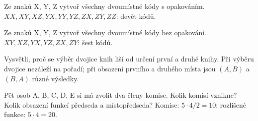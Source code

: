 \documentclass[11pt,a4paper]{article}
\begin{document}

\begin{zadaniReseniBox}[title={Samostatná práce 1}]
Ze znaků X, Y, Z vytvoř všechny dvoumístné kódy s opakováním.
\tcblower
$XX,XY,XZ,YX,YY,YZ,ZX,ZY,ZZ$: devět kódů.
\end{zadaniReseniBox}



\begin{zadaniReseniBox}[title={Samostatná práce 2}]
Ze znaků X, Y, Z vytvoř všechny dvoumístné kódy bez opakování.
\tcblower
$XY,XZ,YX,YZ,ZX,ZY$: šest kódů.
\end{zadaniReseniBox}



\begin{zadaniReseniBox}[title={Samostatná práce 3}]
Vysvětli, proč se výběr dvojice knih liší od určení první a druhé knihy.
\tcblower
Při výběru dvojice nezáleží na pořadí; při obsazení prvního a druhého místa jsou $(A,B)$ a $(B,A)$ různé výsledky.
\end{zadaniReseniBox}




\begin{zadaniReseniBox}[title={Rozšíření 1}]
Pět osob A, B, C, D, E si má zvolit dva členy komise. Kolik komisí vznikne? Kolik obsazení funkcí předseda a místopředseda?
\tcblower
Komise: $5\cdot4/2=10$; rozlišené funkce: $5\cdot4=20$.
\end{zadaniReseniBox}




\end{document}
